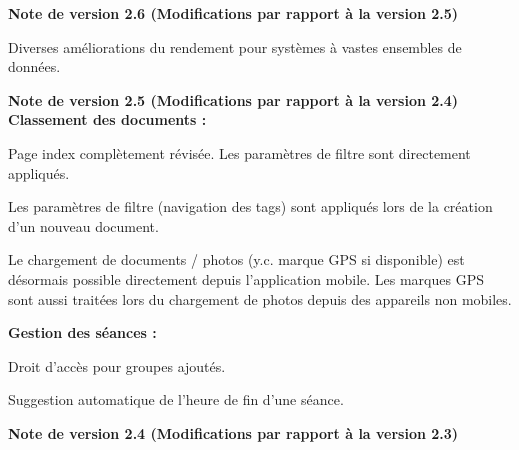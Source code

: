\vspace{\baselineskip}
\textbf{Note de version 2.6 (Modifications par rapport à la version 2.5)} \\
\begin{compactitem}
  \item Diverses améliorations du rendement pour systèmes à vastes ensembles de données.
\end{compactitem}

\vspace{\baselineskip}

\textbf{Note de version 2.5 (Modifications par rapport à la version 2.4)} \\
\textbf{Classement des documents :}
\begin{compactitem}
  \item Page index complètement révisée. Les paramètres de filtre sont directement appliqués.
	\item Les paramètres de filtre (navigation des tags) sont appliqués lors de la création d'un nouveau document.
	\item Le chargement de documents / photos (y.c. marque GPS si disponible) est désormais possible directement depuis l'application mobile. Les marques GPS sont aussi traitées lors du chargement de photos depuis des appareils non mobiles.
\end{compactitem}
\textbf{Gestion des séances :}
\begin{compactitem}
  \item Droit d'accès pour groupes ajoutés.
	\item Suggestion automatique de l'heure de fin d'une séance.
\end{compactitem}

\vspace{\baselineskip}


\textbf{Note de version 2.4 (Modifications par rapport à la version 2.3)} \\

